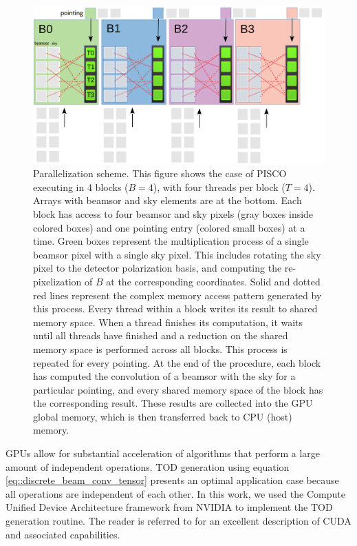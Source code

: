 \documentclass[a4paper,11pt]{article}
\begin{document}
\begin{figure}
	\begin{center}
		\includegraphics[width=0.8\linewidth]{figures/PISCO-diagram.png}
		\caption{Parallelization scheme. This figure shows the case of PISCO executing in 4 blocks ($B=4$), with four threads per block ($T=4$). Arrays with beamsor and sky elements are at the bottom. Each block has access to four beamsor and sky pixels (gray boxes inside colored boxes) and one pointing entry (colored small boxes) at a time. Green boxes represent the multiplication process of a single beamsor pixel with a single sky pixel. This includes rotating the sky pixel to the detector polarization basis, and computing the re-pixelization of $B$ at the corresponding coordinates. Solid and dotted red lines represent the complex memory access pattern generated by this process. Every thread within a block writes its result to shared memory space. When a thread finishes its computation, it waits until all threads have finished and a reduction on the shared memory space is performed across all blocks. This process is repeated for every pointing. At the end of the procedure, each block has computed the convolution of a beamsor with the sky for a particular pointing, and every shared memory space of the block has the corresponding result. These results are collected into the GPU global memory, which is then transferred back to CPU (host) memory.}
		\label{fig::pisco_diagram}
	\end{center}
\end{figure}

GPUs allow for substantial acceleration of algorithms that perform a large amount of independent operations. TOD generation using equation \ref{eq::discrete_beam_conv_tensor} presents an optimal application case because all operations are independent of each other. In this work, we used the Compute Unified Device Architecture framework from NVIDIA to implement the TOD generation routine. The reader is referred to \cite{sanders2010cuda} for an excellent description of CUDA and associated capabilities.
\end{document}
